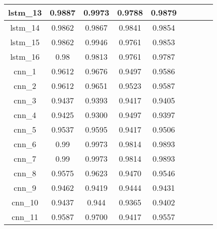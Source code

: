 \begin{table}[p]
\begin{tabular} {|c|c|c|c|c|c|c|c|c| }
        lstm\_13 & 0.9887                       & 0.9973    & 0.9788 & 0.9879 \\ \hline
        lstm\_14 & 0.9862                       & 0.9867    & 0.9841 & 0.9854 \\ \hline
        lstm\_15 & 0.9862                       & 0.9946    & 0.9761 & 0.9853 \\ \hline
        lstm\_16 & 0.98                         & 0.9813    & 0.9761 & 0.9787 \\ \hline
        cnn\_1   & 0.9612                       & 0.9676    & 0.9497 & 0.9586 \\ \hline
        cnn\_2   & 0.9612                       & 0.9651    & 0.9523 & 0.9587 \\ \hline
        cnn\_3   & 0.9437                       & 0.9393    & 0.9417 & 0.9405 \\ \hline
        cnn\_4   & 0.9425                       & 0.9300    & 0.9497 & 0.9397 \\ \hline
        cnn\_5   & 0.9537                       & 0.9595    & 0.9417 & 0.9506 \\ \hline
        cnn\_6   & 0.99                         & 0.9973    & 0.9814 & 0.9893 \\ \hline
        cnn\_7   & 0.99                         & 0.9973    & 0.9814 & 0.9893 \\ \hline
        cnn\_8   & 0.9575                       & 0.9623    & 0.9470 & 0.9546 \\ \hline
        cnn\_9   & 0.9462                       & 0.9419    & 0.9444 & 0.9431 \\ \hline
        cnn\_10  & 0.9437                       & 0.944     & 0.9365 & 0.9402 \\ \hline
        cnn\_11  & 0.9587                       & 0.9700    & 0.9417 & 0.9557 \\ \hline
    \end{tabular}
\end{table}


